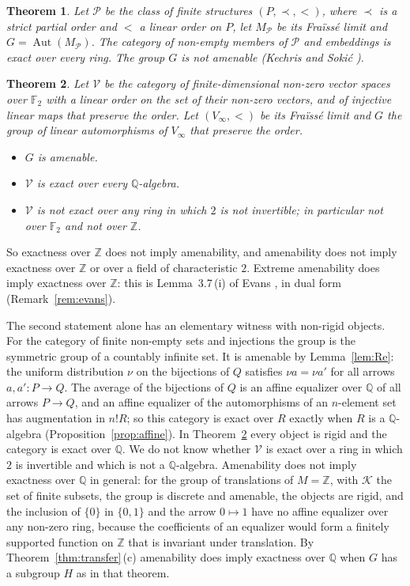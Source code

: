 \documentclass[11pt,a4paper]{article}
\newtheorem{theorem}{Theorem}[section]
\theoremstyle{definition}
\newcommand{\K}{\mathcal{K}}
\newcommand{\V}{\mathcal{V}}
\newcommand{\Po}{\mathcal{P}}
\newcommand{\Z}{\mathbb{Z}}
\newcommand{\Q}{\mathbb{Q}}
\newcommand{\F}{\mathbb{F}}
\newcommand{\Aut}{\operatorname{Aut}}
\begin{document}
\begin{theorem}\label{thm:posets}
Let $\Po$ be the class of finite structures $(P,\prec,<)$, where $\prec$ is a
strict partial order and $<$ a linear order on $P$, let $M_{\Po}$ be its
Fra\"iss\'e limit and $G=\Aut(M_{\Po})$. The category of non-empty members of
$\Po$ and embeddings is exact over every ring. The group $G$ is not amenable
\textup{(}Kechris and Soki\'c \cite[Remark~3.2]{KS}\textup{)}.
\end{theorem}

\begin{theorem}\label{thm:vector}
Let $\V$ be the category of finite-dimensional non-zero vector spaces over
$\F_2$ with a linear order on the set of their non-zero vectors, and of
injective linear maps that preserve the order. Let $(V_\infty,<)$ be its
Fra\"iss\'e limit and $G$ the group of linear automorphisms of $V_\infty$ that
preserve the order.
\begin{itemize}
\item[\textup{(a)}] $G$ is amenable.
\item[\textup{(b)}] $\V$ is exact over every $\Q$-algebra.
\item[\textup{(c)}] $\V$ is not exact over any ring in which $2$ is not
invertible; in particular not over $\F_2$ and not over $\Z$.
\end{itemize}
\end{theorem}

So exactness over $\Z$ does not imply amenability, and amenability does not
imply exactness over $\Z$ or over a field of characteristic $2$. Extreme
amenability does imply exactness over $\Z$: this is Lemma~3.7\,(i) of Evans
\cite{Ev}, in dual form (Remark~\ref{rem:evans}).

The second statement alone has an elementary witness with non-rigid objects.
For the category of finite non-empty sets and injections the group is the
symmetric group of a countably infinite set. It is amenable by
Lemma~\ref{lem:Re}: the uniform distribution $\nu$ on the bijections of $Q$
satisfies $\nu a=\nu a'$ for all arrows $a,a'\colon P\to Q$. The average of
the bijections of $Q$ is an affine equalizer over $\Q$ of all arrows
$P\to Q$, and an affine equalizer of the automorphisms of an $n$-element set
has augmentation in $n!R$; so this category is exact over $R$ exactly when
$R$ is a $\Q$-algebra (Proposition~\ref{prop:affine}). In
Theorem~\ref{thm:vector} every object is rigid and the category is exact
over $\Q$. We do not know whether $\V$ is exact over a ring in which $2$ is
invertible and which is not a $\Q$-algebra. Amenability does not imply
exactness over $\Q$ in general: for the group of translations of $M=\Z$,
with $\K$ the set of finite subsets, the group is discrete and amenable,
the objects are rigid, and the inclusion of $\{0\}$ in $\{0,1\}$ and the
arrow $0\mapsto1$ have no affine equalizer over any non-zero ring, because
the coefficients of an equalizer would form a finitely supported function
on $\Z$ that is invariant under translation. By
Theorem~\ref{thm:transfer}\,(c) amenability does imply exactness over $\Q$
when $G$ has a subgroup $H$ as in that theorem.
\end{document}

